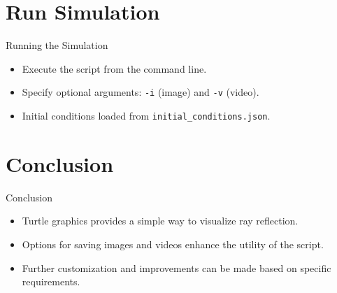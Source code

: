 \documentclass[aspectratio=169, 10pt]{beamer}
\begin{document}
\section{Run Simulation}
\begin{frame}{Running the Simulation}
  \begin{itemize}
    \item Execute the script from the command line.
    \item Specify optional arguments: \texttt{-i} (image) and \texttt{-v} (video).
    \item Initial conditions loaded from \texttt{initial\_conditions.json}.
  \end{itemize}
\end{frame}

\section{Conclusion}
\begin{frame}{Conclusion}
  \begin{itemize}
    \item Turtle graphics provides a simple way to visualize ray reflection.
    \item Options for saving images and videos enhance the utility of the script.
    \item Further customization and improvements can be made based on specific requirements.
  \end{itemize}
\end{frame}
\end{document}
